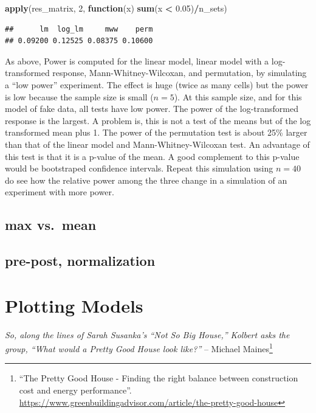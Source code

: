 \documentclass[]{book}
\newenvironment{Shaded}{\begin{snugshade}}{\end{snugshade}}
\newcommand{\KeywordTok}[1]{\textcolor[rgb]{0.13,0.29,0.53}{\textbf{#1}}}
\newcommand{\DecValTok}[1]{\textcolor[rgb]{0.00,0.00,0.81}{#1}}
\newcommand{\FloatTok}[1]{\textcolor[rgb]{0.00,0.00,0.81}{#1}}
\newcommand{\StringTok}[1]{\textcolor[rgb]{0.31,0.60,0.02}{#1}}
\newcommand{\ControlFlowTok}[1]{\textcolor[rgb]{0.13,0.29,0.53}{\textbf{#1}}}
\newcommand{\OperatorTok}[1]{\textcolor[rgb]{0.81,0.36,0.00}{\textbf{#1}}}
\newcommand{\NormalTok}[1]{#1}
\let\rmarkdownfootnote\footnote%
\def\footnote{\protect\rmarkdownfootnote}
\begin{document}
\begin{Shaded}
\begin{Highlighting}[]
\KeywordTok{apply}\NormalTok{(res_matrix, }\DecValTok{2}\NormalTok{, }\ControlFlowTok{function}\NormalTok{(x) }\KeywordTok{sum}\NormalTok{(x }\OperatorTok{<}\StringTok{ }\FloatTok{0.05}\NormalTok{)}\OperatorTok{/}\NormalTok{n_sets)}
\end{Highlighting}
\end{Shaded}

\begin{verbatim}
##      lm  log_lm     mww    perm 
## 0.09200 0.12525 0.08375 0.10600
\end{verbatim}

As above, Power is computed for the linear model, linear model with a
log-transformed response, Mann-Whitney-Wilcoxan, and permutation, by
simulating a ``low power'' experiment. The effect is huge (twice as many
cells) but the power is low because the sample size is small
(\(n = 5\)). At this sample size, and for this model of fake data, all
tests have low power. The power of the log-transformed response is the
largest. A problem is, this is not a test of the means but of the log
transformed mean plus 1. The power of the permutation test is about 25\%
larger than that of the linear model and Mann-Whitney-Wilcoxan test. An
advantage of this test is that it is a p-value of the mean. A good
complement to this p-value would be bootstraped confidence intervals.
Repeat this simulation using \(n=40\) do see how the relative power
among the three change in a simulation of an experiment with more power.

\section{max vs.~mean}\label{max-vs.mean}

\section{pre-post, normalization}\label{pre-post-normalization}

\chapter{Plotting Models}\label{plotting-models}

\emph{So, along the lines of Sarah Susanka's ``Not So Big House,''
Kolbert asks the group, ``What would a Pretty Good House look like?''}
-- Michael Maines\footnote{``The Pretty Good House - Finding the right
  balance between construction cost and energy performance''.
  \url{https://www.greenbuildingadvisor.com/article/the-pretty-good-house}}
\end{document}
